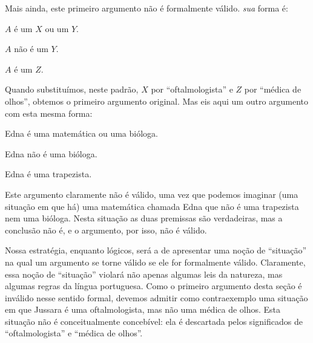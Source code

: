Mais ainda, este primeiro argumento não é formalmente válido. \emph{sua} forma é:
\begin{earg}
	\item[] $A$ é um $X$ ou um $Y$.
	\item[] $A$ não é um $Y$.
	\item[\therefore] $A$ é um $Z$.
\end{earg}
Quando substituímos, neste padrão, $X$ por ``oftalmologista'' e $Z$ por ``médica de olhos'', obtemos o primeiro argumento original.
Mas eis aqui um outro argumento com esta mesma forma:
\begin{earg}
	\item[] Edna é uma matemática ou uma bióloga.
	\item[] Edna não é uma bióloga.
	\item[\therefore] Edna é uma trapezista.
\end{earg}
Este argumento claramente não é válido, uma vez que podemos imaginar (uma situação em que há) uma matemática chamada Edna que não é uma trapezista nem uma bióloga.
Nesta situação as duas premissas são verdadeiras, mas a conclusão não é, e o argumento, por isso, não é válido.

Nossa estratégia, enquanto lógicos, será a de apresentar uma noção de ``situação'' na qual um argumento se torne válido se ele for formalmente válido.
Claramente, essa noção de ``situação'' violará não apenas algumas leis da natureza, mas algumas regras da língua portuguesa.
Como o primeiro argumento desta seção é inválido nesse sentido formal, devemos admitir como contraexemplo uma situação em que Jussara é uma oftalmologista, mas não uma médica de olhos.
Esta situação não é conceitualmente concebível: ela é descartada pelos significados de ``oftalmologista'' e ``médica de olhos''.

